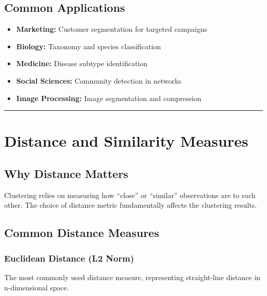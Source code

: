 \documentclass[
]{article}
\begin{document}
\textbf{ }

\subsection{Common Applications}

\begin{itemize}
\item
  \textbf{Marketing:} Customer segmentation for targeted campaigns
\item
  \textbf{Biology:} Taxonomy and species classification
\item
  \textbf{Medicine:} Disease subtype identification
\item
  \textbf{Social Sciences:} Community detection in networks
\item
  \textbf{Image Processing:} Image segmentation and compression
\end{itemize}

\begin{center}\rule{0.5\linewidth}{0.5pt}\end{center}

\textbf{ }

\section{Distance and Similarity Measures}

\textbf{ }

\subsection{Why Distance Matters}

Clustering relies on measuring how ``close'' or ``similar'' observations
are to each other. The choice of distance metric fundamentally affects
the clustering results.

\textbf{ }

\subsection{Common Distance Measures}

\subsubsection{Euclidean Distance (L2 Norm)}

The most commonly used distance measure, representing straight-line
distance in n-dimensional space.
\end{document}
